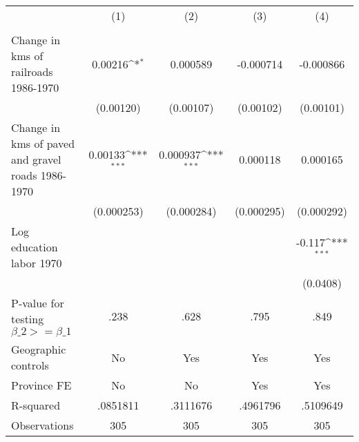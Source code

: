 {
\def\sym#1{\ifmmode^{#1}\else\(^{#1}\)\fi}
\begin{tabular}{l*{4}{c}}
\hline\hline
                &\multicolumn{1}{c}{(1)}&\multicolumn{1}{c}{(2)}&\multicolumn{1}{c}{(3)}&\multicolumn{1}{c}{(4)}\\
                &\multicolumn{1}{c}{}&\multicolumn{1}{c}{}&\multicolumn{1}{c}{}&\multicolumn{1}{c}{}\\
\hline
Change in kms of railroads 1986-1970&  0.00216\sym{*}  & 0.000589         &-0.000714         &-0.000866         \\
                &(0.00120)         &(0.00107)         &(0.00102)         &(0.00101)         \\
[1em]
Change in kms of paved and gravel roads 1986-1970&  0.00133\sym{***}& 0.000937\sym{***}& 0.000118         & 0.000165         \\
                &(0.000253)         &(0.000284)         &(0.000295)         &(0.000292)         \\
[1em]
Log education labor 1970&                  &                  &                  &   -0.117\sym{***}\\
                &                  &                  &                  & (0.0408)         \\
\hline
P-value for testing $\beta\_{2} >= \beta\_{1}$&     .238         &     .628         &     .795         &     .849         \\
Geographic controls&       No         &      Yes         &      Yes         &      Yes         \\
Province FE     &       No         &       No         &      Yes         &      Yes         \\
R-squared       & .0851811         & .3111676         & .4961796         & .5109649         \\
Observations    &      305         &      305         &      305         &      305         \\
\hline\hline
\end{tabular}
}
